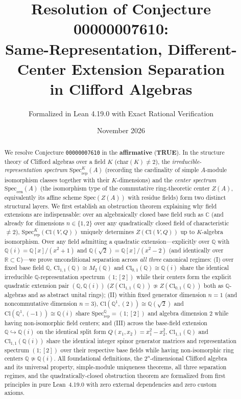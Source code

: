 \documentclass[11pt,a4paper]{article}
\title{\textbf{Resolution of Conjecture 00000007610:\\
Same-Representation, Different-Center Extension Separation\\
in Clifford Algebras}}
\author{Formalized in Lean 4.19.0 with Exact Rational Verification}
\date{November 2026}
\theoremstyle{plain}
\theoremstyle{definition}
\newcommand{\Cl}{\mathrm{Cl}}
\newcommand{\Specrep}{\mathrm{Spec}_{\mathrm{rep}}}
\newcommand{\Speccen}{\mathrm{Spec}_{\mathrm{cen}}}
\newcommand{\Spec}{\mathrm{Spec}}
\newcommand{\Mat}{M}
\newcommand{\Q}{\mathbb{Q}}
\newcommand{\R}{\mathbb{R}}
\newcommand{\C}{\mathbb{C}}
\begin{document}
\maketitle

\begin{abstract}
We resolve Conjecture \texttt{00000007610} in the \textbf{affirmative} (\textbf{TRUE}).
In the structure theory of Clifford algebras over a field $K$ ($\mathrm{char}(K) \neq 2$), the \emph{irreducible-representation spectrum} $\Specrep^K(A)$ (recording the cardinality of simple $A$-module isomorphism classes together with their $K$-dimensions) and the \emph{center spectrum} $\Speccen(A)$ (the isomorphism type of the commutative ring-theoretic center $Z(A)$, equivalently its affine scheme $\Spec(Z(A))$ with residue fields) form two distinct structural layers.
We first establish an obstruction theorem explaining why field extensions are indispensable: over an algebraically closed base field such as $\C$ (and already for dimensions $n \in \{1,2\}$ over any quadratically closed field of characteristic $\neq 2$), $\Specrep^K(\Cl(V,Q))$ uniquely determines $Z(\Cl(V,Q))$ up to $K$-algebra isomorphism.
Over any field admitting a quadratic extension---explicitly over $\Q$ with $\Q(i) = \Q[x]/(x^2+1)$ and $\Q(\sqrt{2}) = \Q[x]/(x^2-2)$ (and identically over $\R \subset \C$)---we prove unconditional separation across \emph{all three} canonical regimes:
(I) over fixed base field $\Q$, $\Cl_{1,1}(\Q) \cong \Mat_2(\Q)$ and $\Cl_{0,1}(\Q) \cong \Q(i)$ share the identical irreducible $\Q$-representation spectrum $(1;[2])$ while their centers form the explicit quadratic extension pair $(\Q, \Q(i))$ ($Z(\Cl_{1,1}(\Q)) \not\simeq Z(\Cl_{0,1}(\Q))$ both as $\Q$-algebras and as abstract unital rings);
(II) within fixed generator dimension $n=1$ (and noncommutative dimension $n=3$), $\Cl(\Q^1,(2)) \cong \Q(\sqrt{2})$ and $\Cl(\Q^1,(-1)) \cong \Q(i)$ share $\Specrep^\Q = (1;[2])$ and algebra dimension $2$ while having non-isomorphic field centers; and
(III) across the base-field extension $\Q \hookrightarrow \Q(i)$ on the identical split form $Q(x_1,x_2)=x_1^2-x_2^2$, $\Cl_{1,1}(\Q)$ and $\Cl_{1,1}(\Q(i))$ share the identical integer spinor generator matrices and representation spectrum $(1;[2])$ over their respective base fields while having non-isomorphic ring centers $\Q \not\simeq \Q(i)$.
All foundational definitions, the $2^n$-dimensional Clifford algebra and its universal property, simple-module uniqueness theorems, all three separation regimes, and the quadratically-closed obstruction theorem are formalized from first principles in pure Lean~4.19.0 with zero external dependencies and zero custom axioms.
\end{abstract}
\end{document}

